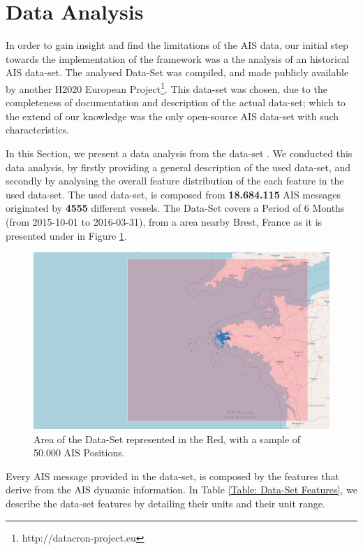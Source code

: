 \section{Data Analysis}
\label{section: Data Analysis}
In order to gain insight and find the limitations of the AIS data, our initial step towards the implementation of the framework was a the analysis of an historical AIS data-set. The analysed Data-Set was compiled, and made publicly available by another H2020 European Project\footnote{http://datacron-project.eu}. 
This data-set was chosen, due to the completeness of documentation and description of the actual data-set; which to the extend of our knowledge was the only open-source AIS data-set with such characteristics.  

In this Section, we present a data analysis from the data-set \cite{DATASET}. We conducted this data analysis, by firstly providing a general description of the used data-set, and secondly by analysing the overall feature distribution of the each feature in the used data-set.
The used data-set, is composed from \textbf{18.684.115} AIS messages originated by \textbf{4555} different vessels. The Data-Set covers a Period of 6 Months (from 2015-10-01 to 2016-03-31), from a area nearby Brest, France as it is presented under in Figure \ref{fig:DS_Sample}.

\begin{figure}[H]
\centering
\includegraphics[scale = .23]{figures/Ch4/nari_DS_ex2.png}
\caption{Area of the Data-Set represented in the Red, with a sample of 50.000 AIS Positions.}
\label{fig:DS_Sample}
\end{figure}

Every AIS message provided in the data-set, is composed by the features that derive from the AIS dynamic information. In Table \ref{Table: Data-Set Features}, we describe the data-set features by detailing their units and their unit range. 

